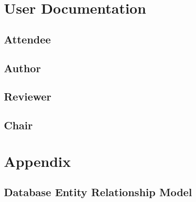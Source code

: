 \documentclass[nochapterpage,nopartpage,numbersubsubsec,bigchapter,colorback,accentcolor=tud9c]{tudreport}
\begin{document}
\part{User Documentation}
\label{part:user-doc}

  \chapter{Attendee}
  \chapter{Author}
  \chapter{Reviewer}
  \chapter{Chair}




\part{Appendix}
\label{part:appendix}

  \chapter*{Database Entity Relationship Model}

\end{document}
